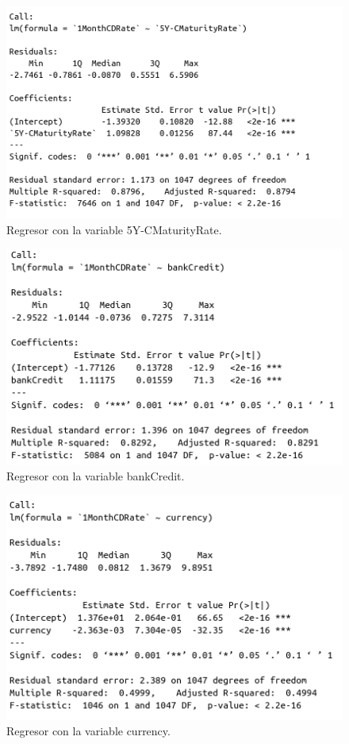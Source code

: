 \documentclass[12pt,a4paper]{article}
\begin{document}
\begin{figure}[H]
	\centering 
	\includegraphics[scale=0.55]{./Imagenes/Regresion/regresor_1va6.png}
	\caption{Regresor con la variable 5Y-CMaturityRate.}
\end{figure}

\begin{figure}[H]
	\centering 
	\includegraphics[scale=0.55]{./Imagenes/Regresion/regresor_1va7.png}
	\caption{Regresor con la variable bankCredit.}
\end{figure}

\begin{figure}[H]
	\centering 
	\includegraphics[scale=0.55]{./Imagenes/Regresion/regresor_1va8.png}
	\caption{Regresor con la variable currency.}
\end{figure}
\end{document}
